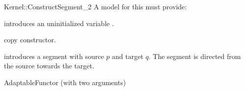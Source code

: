 \begin{ccRefFunctionObjectConcept}{Kernel::ConstructSegment_2}
A model for this must provide:




\ccHidden {}
             {introduces an uninitialized variable .}

\ccHidden {}
            {copy constructor.}

            {introduces a segment  with source $p$
             and target $q$. The segment is directed from the source towards
             the target.}

\ccRefines
AdaptableFunctor (with two arguments)

\ccSeeAlso
{}\\

\end{ccRefFunctionObjectConcept}

